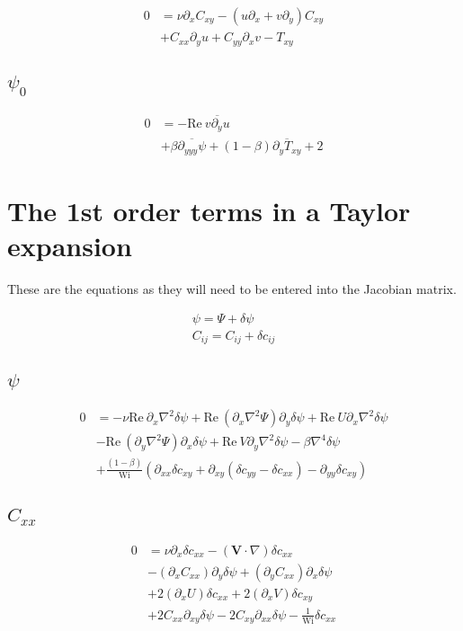 \documentclass[12,a4paper]{article}
\newcommand{\dd}[1]{\partial_{#1}}
\newcommand{\lpl}{\nabla^{2}}
\newcommand{\bih}{\nabla^{4}}
\newcommand{\scij}{\delta c_{ij}}
\newcommand{\scxx}{\delta c_{xx}}
\newcommand{\scyy}{\delta c_{yy}}
\newcommand{\scxy}{\delta c_{xy}}
\newcommand{\spsi}{\delta \psi}
\newcommand{\Wi}{\mathrm{Wi}}
\newcommand{\Rey}{\mathrm{Re \ }}
\begin{document}
\begin{align}
    0 &= \nu \dd{x} C_{xy} - (u\dd{x} + v\dd{y}) C_{xy} \nonumber\\
    &+ C_{xx} \dd{y}u + C_{yy}\dd{x}v - T_{xy}
\end{align}

\subsection{$\psi_{0}$}

\begin{align}
    0 &= - \Rey \overline{v\dd{y}u} \nonumber\\
    &+ \beta \overline{\dd{yyy}\psi} + (1-\beta)\overline{\dd{y}T_{xy}} + 2
\end{align}

\section{The 1st order terms in a Taylor expansion}

These are the equations as they will need to be entered into the Jacobian matrix.

\begin{align}
\psi = \Psi + \spsi \\
C_{ij} = C_{ij} +\scij
\end{align}

\subsection{$\psi$}

\begin{align}
    0 &= - \nu\Rey\dd{x}\lpl\spsi +  \Rey (\dd{x}\lpl\Psi) \dd{y}\spsi + \Rey U \dd{x}\lpl \spsi \nonumber\\
    &- \Rey (\dd{y}\lpl \Psi) \dd{x} \spsi + \Rey V \dd{y} \lpl \spsi - \beta \bih \spsi \nonumber\\
    &+ \frac{(1-\beta)}{\Wi} \left( \dd{xx} \scxy +\dd{xy} (\scyy -\scxx) - \dd{yy} \scxy \right)
\end{align}

\subsection{$C_{xx}$}

\begin{align}
    0 &= \nu \dd{x} \scxx - (\mathbf{V}\cdot \nabla) \scxx \nonumber \\
    &- (\dd{x}C_{xx})\dd{y}\spsi + (\dd{y}C_{xx})\dd{x} \spsi \nonumber\\
    &+ 2(\dd{x} U) \scxx + 2(\dd{x} V) \scxy \nonumber\\
    &+ 2C_{xx}\dd{xy} \spsi - 2C_{xy}\dd{xx}\spsi - \frac{1}{\Wi}\scxx
\end{align}
\end{document}
